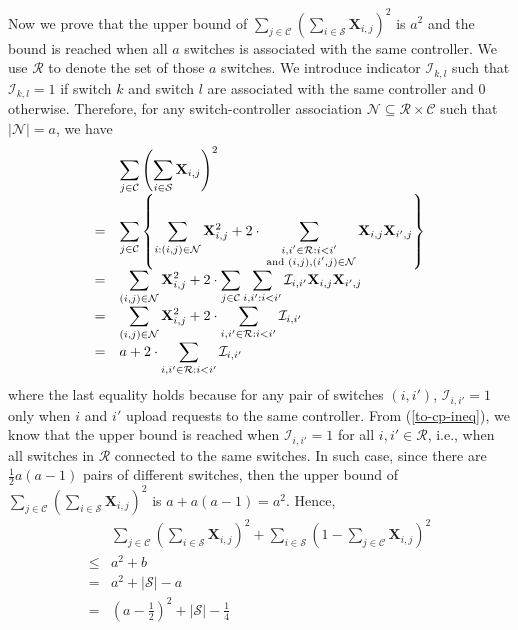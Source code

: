 \documentclass[10pt,journal,compsoc]{IEEEtran}
\begin{document}
Now we prove that the upper bound of $\sum_{j \in \mathcal{C}} \left( \sum_{i \in \mathcal{S}} \mathbf{X}_{i,j} \right)^2$ is $a^2$ and the bound is reached when all $a$ switches is associated with the same controller. We use $\mathcal{R}$ to denote the set of those $a$ switches. We introduce indicator $\mathcal{I}_{k,l}$ such that $\mathcal{I}_{k,l} = 1$ if switch $k$ and switch $l$ are associated with the same controller and $0$ otherwise. Therefore, for any switch-controller association $\mathcal{N} \subseteq \mathcal{R} \times \mathcal{C}$ such that $|\mathcal{N}| = a$, we have
\begin{equation}\label{to-cp-ineq}
	\begin{array}{cl}
		& \displaystyle \sum_{j \in \mathcal{C}} \left( \sum_{i \in \mathcal{S}} \mathbf{X}_{i,j} \right)^2 \\
		= & \displaystyle \sum_{j \in \mathcal{C}} \left\{ \sum_{i: (i,j) \in \mathcal{N}} \mathbf{X}_{i,j}^2 + 2 \cdot \sum_{\substack{i, i' \in \mathcal{R}: i < i' \\ \text{ and } \newline (i,j), (i',j) \in \mathcal{N}}} \mathbf{X}_{i,j} \mathbf{X}_{i',j} \right\} \\
		= & \displaystyle \sum_{(i,j) \in \mathcal{N}} \mathbf{X}_{i,j}^2 + 2 \cdot \sum_{j \in \mathcal{C}} \sum_{i, i': i < i'} \mathcal{I}_{i,i'} \mathbf{X}_{i,j} \mathbf{X}_{i',j} \\
		= & \displaystyle \sum_{(i,j) \in \mathcal{N}} \mathbf{X}_{i,j}^2 + 2 \cdot \sum_{i, i' \in \mathcal{R}: i < i'} \mathcal{I}_{i,i'} \\
		= & \displaystyle a + 2 \cdot \sum_{i, i' \in \mathcal{R}: i < i'} \mathcal{I}_{i,i'}
	\end{array}
\end{equation}
where the last equality holds because for any pair of switches $(i,i')$, $\mathcal{I}_{i,i'} = 1$ only when $i$ and $i'$ upload requests to the same controller. From (\ref{to-cp-ineq}), we know that the upper bound is reached when $\mathcal{I}_{i,i'} = 1$ for all $i, i' \in \mathcal{R}$, i.e., when all switches in $\mathcal{R}$ connected to the same switches. In such case, since there are $\frac{1}{2}a(a-1)$ pairs of different switches, then the upper bound of $\sum_{j \in \mathcal{C}} \left( \sum_{i \in \mathcal{S}} \mathbf{X}_{i,j} \right)^2$ is $a + a(a-1) = a^2$. Hence, 
\begin{equation}\label{tt-ineq}
	\begin{array}{cl}
		& \displaystyle \sum_{j \in \mathcal{C}} \left( \sum_{i \in \mathcal{S}} \mathbf{X}_{i,j} \right)^2 + \sum_{i \in \mathcal{S}} (1 - \sum_{j \in \mathcal{C}} \mathbf{X}_{i,j})^2 \\
		\le & \displaystyle a^2 + b \\
		= & a^2 + |\mathcal{S}| - a \\
		= & \left( a - \frac{1}{2} \right)^2 + |\mathcal{S}| - \frac{1}{4}
	\end{array}
\end{equation}
\end{document}
